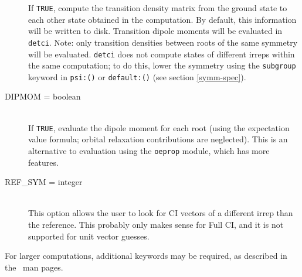 \begin{description}
If {\tt TRUE}, compute the transition density matrix from the ground
state to each other state obtained in the computation.  By default,
this information will be written to disk.  Transition dipole moments
will be evaluated in {\tt detci}.  Note: only transition densities
between roots of the same symmetry will be evaluated.  {\tt detci} does not
compute states of different irreps within the same computation; to do this,
lower the symmetry using the {\tt subgroup} keyword in {\tt psi:()}
or {\tt default:()} (see section \ref{symm-spec}).
\item[DIPMOM = boolean]\mbox{}\\
If {\tt TRUE}, evaluate the dipole moment for each root (using the expectation
value formula; orbital relaxation contributions are neglected).  This is
an alternative to evaluation using the {\tt oeprop} module, which has
more features.
\item[REF\_SYM = integer]\mbox{}\\
This option allows the user to look for CI vectors of a different irrep
than the reference.  This probably only makes sense for Full CI,
and it is not supported for unit vector guesses.
\end{description}

For larger computations, additional keywords may be required, as
described in the \PSIdetci\ man pages.

